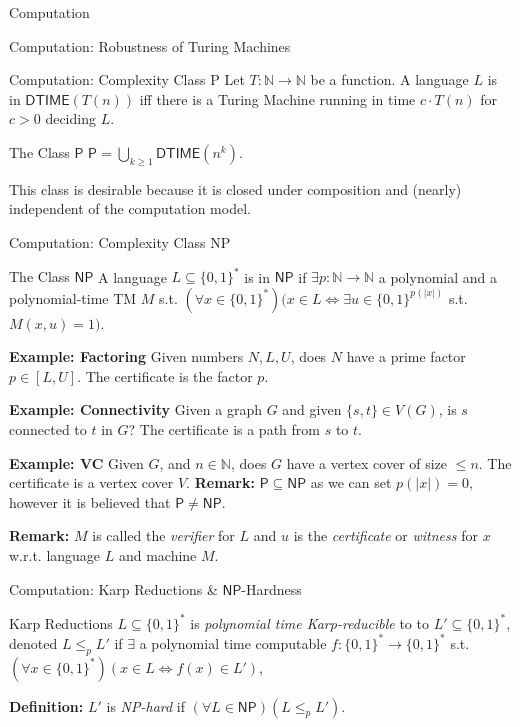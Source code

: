 \documentclass{beamer}
\begin{document}
\begin{section}{Computation}
\begin{frame}{Computation: Robustness of Turing Machines}
\end{frame}

\begin{frame}{Computation: Complexity Class P}
    Let $T:\mathbb{N}\rightarrow \mathbb{N}$ be a function. A language $L$ is in $\mathsf{DTIME}(T(n))$ iff there is a Turing Machine running in time $c\cdot T(n)$ for $c>0$ deciding $L$.
    \begin{block}{The Class $\mathsf{P}$}
        $\mathsf{P}=\bigcup_{k\geq 1} \mathsf{DTIME}(n^k)$.
    \end{block}
    This class is desirable because it is closed under composition and (nearly) independent of the computation model.
\end{frame}

\begin{frame}{Computation: Complexity Class NP}
    \begin{block}{The Class $\mathsf{NP}$}
    A language $L\subseteq \{0,1\}^*$ is in $\mathsf{NP}$ if $\exists p:\mathbb{N}\rightarrow \mathbb{N}$ a polynomial and a polynomial-time TM $M$ s.t. $(\forall x\in \{0,1\}^*)(x\in L\iff \exists u \in \{0,1\}^{p(|x|)}$ s.t. $M(x,u)=1)$.
    \end{block}
    \textbf{Example: Factoring} Given numbers $N,L,U$, does $N$ have a prime factor $p\in [L,U]$. The certificate is the factor $p$.
    
    \textbf{Example: Connectivity} Given a graph $G$ and given $\{s,t\}\in V(G)$, is $s$ connected to $t$ in $G$? The certificate is a path from $s$ to $t$. 
    
    \textbf{Example: VC} Given $G$, and $n\in \mathbb{N}$, does $G$ have a vertex cover of size $\leq n$. The certificate is a vertex cover $V$.
    \newline
    \newline
    \textbf{Remark:} $\mathsf{P}\subseteq \mathsf{NP}$ as we can set $p(|x|)=0$, however it is believed that $\mathsf{P}\neq \mathsf{NP}$.
    
    \textbf{Remark:} $M$ is called the \textit{verifier} for $L$ and $u$ is the \textit{certificate} or \textit{witness} for $x$ w.r.t. language $L$ and machine $M$. 
    
\end{frame}{}

\begin{frame}{Computation: Karp Reductions \& $\mathsf{NP}$-Hardness}
    \begin{block}{Karp Reductions}
    $L\subseteq\{0,1\}^*$ is \textit{polynomial time Karp-reducible} to to $L'\subseteq \{0,1\}^*$, denoted $L\leq_p L'$ if $\exists$ a polynomial time computable $f:\{0,1\}^*\rightarrow \{0,1\}^*$ s.t. $(\forall x \in \{0,1\}^*)(x\in L \iff f(x)\in L')$,
    \end{block}
    \textbf{Definition:} $L'$ is \textit{NP-hard} if $(\forall L \in \mathsf{NP})(L\leq_p L')$.
    

\end{frame}
\end{section}
\end{document}
